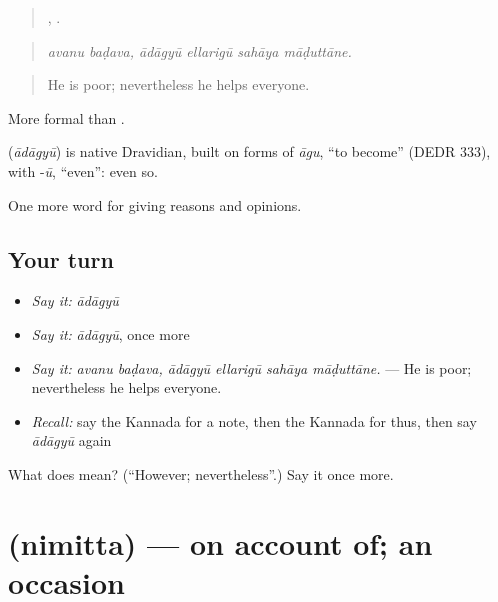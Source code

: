 \begin{quote}
 ,    .
\end{quote}

\begin{quote}
\emph{avanu baḍava, ādāgyū ellarigū sahāya māḍuttāne.}
\end{quote}

\begin{quote}
He is poor; nevertheless he helps everyone.
\end{quote}

More formal than .

\begin{cousinweb}
\textbf{} (\emph{ādāgyū}) is native Dravidian, built on forms of \emph{āgu}, \textquotedblleft{}to become\textquotedblright{} (DEDR 333), with -\emph{ū}, \textquotedblleft{}even\textquotedblright{}: even so.
\end{cousinweb}

\begin{grammarlens}[title={What you've built}]
One more word for giving reasons and opinions.
\end{grammarlens}

\subsection*{Your turn}
\begin{itemize}
\raggedright
  \item \emph{Say it:} \emph{ādāgyū}
  \item \emph{Say it:} \emph{ādāgyū}, once more
  \item \emph{Say it:} \emph{avanu baḍava, ādāgyū ellarigū sahāya māḍuttāne.} — He is poor; nevertheless he helps everyone.
  \item \emph{Recall:} say the Kannada for a note, then the Kannada for thus, then say \emph{ādāgyū} again
\end{itemize}

\begin{tcolorbox}[breakable,colback=teal!4,colframe=teal!35!black,title={Before you move on}]
What does  mean? (\textquotedblleft{}However; nevertheless\textquotedblright{}.) Say it once more.
\end{tcolorbox}
\section[\texorpdfstring{\kn{ನಿಮಿತ್ತ} (nimitta)}{ನಿಮಿತ್ತ (nimitta)}]{ (nimitta) — on account of; an occasion}

